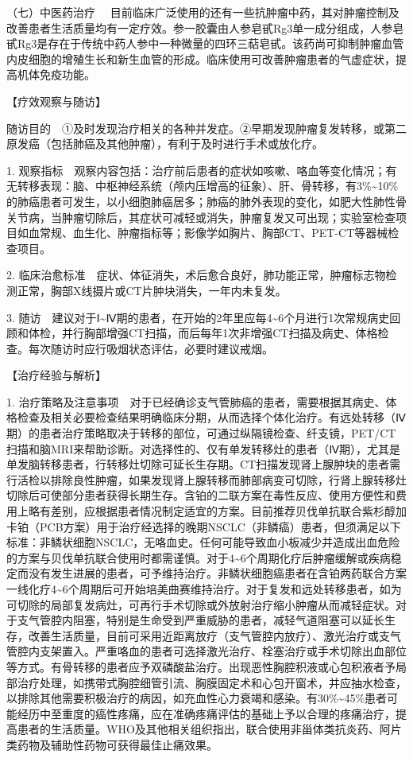 {（七）中医药治疗}
　目前临床广泛使用的还有一些抗肿瘤中药，其对肿瘤控制及改善患者生活质量均有一定疗效。参一胶囊由人参皂甙Rg3单一成分组成，人参皂甙Rg3是存在于传统中药人参中一种微量的四环三萜皂甙。该药尚可抑制肿瘤血管内皮细胞的增殖生长和新生血管的形成。临床使用可改善肿瘤患者的气虚症状，提高机体免疫功能。

【疗效观察与随访】

随访目的　①及时发现治疗相关的各种并发症。②早期发现肿瘤复发转移，或第二原发癌（包括肺癌及其他肿瘤），有利于及时进行手术或放化疗。

1.
观察指标　观察内容包括：治疗前后患者的症状如咳嗽、咯血等变化情况；有无转移表现：脑、中枢神经系统（颅内压增高的征象）、肝、骨转移，有3\%\textasciitilde{}10\%的肺癌患者可发生，以小细胞肺癌居多；肺癌的肺外表现的变化，如肥大性肺性骨关节病，当肿瘤切除后，其症状可减轻或消失，肿瘤复发又可出现；实验室检查项目如血常规、血生化、肿瘤指标等；影像学如胸片、胸部CT、PET-CT等器械检查项目。

2.
临床治愈标准　症状、体征消失，术后愈合良好，肺功能正常，肿瘤标志物检测正常，胸部X线摄片或CT片肿块消失，一年内未复发。

3.
随访　建议对于Ⅰ\textasciitilde{}Ⅳ期的患者，在开始的2年里应每4\textasciitilde{}6个月进行1次常规病史回顾和体检，并行胸部增强CT扫描，而后每年1次非增强CT扫描及病史、体格检查。每次随访时应行吸烟状态评估，必要时建议戒烟。

【治疗经验与解析】

1.
治疗策略及注意事项　对于已经确诊支气管肺癌的患者，需要根据其病史、体格检查及相关必要检查结果明确临床分期，从而选择个体化治疗。有远处转移（Ⅳ期）的患者治疗策略取决于转移的部位，可通过纵隔镜检查、纤支镜，PET/CT扫描和脑MRI来帮助诊断。对选择性的、仅有单发转移灶的患者（Ⅳ期），尤其是单发脑转移患者，行转移灶切除可延长生存期。CT扫描发现肾上腺肿块的患者需行活检以排除良性肿瘤，如果发现肾上腺转移而肺部病变可切除，行肾上腺转移灶切除后可使部分患者获得长期生存。含铂的二联方案在毒性反应、使用方便性和费用上略有差别，应根据患者情况制定适宜的方案。目前推荐贝伐单抗联合紫杉醇加卡铂（PCB方案）用于治疗经选择的晚期NSCLC（非鳞癌）患者，但须满足以下标准：非鳞状细胞NSCLC，无咯血史。任何可能导致血小板减少并造成出血危险的方案与贝伐单抗联合使用时都需谨慎。对于4\textasciitilde{}6个周期化疗后肿瘤缓解或疾病稳定而没有发生进展的患者，可予维持治疗。非鳞状细胞癌患者在含铂两药联合方案一线化疗4\textasciitilde{}6个周期后可开始培美曲赛维持治疗。对于复发和远处转移患者，如为可切除的局部复发病灶，可再行手术切除或外放射治疗缩小肿瘤从而减轻症状。对于支气管腔内阻塞，特别是生命受到严重威胁的患者，减轻气道阻塞可以延长生存，改善生活质量，目前可采用近距离放疗（支气管腔内放疗）、激光治疗或支气管腔内支架置入。严重咯血的患者可选择激光治疗、栓塞治疗或手术切除出血部位等方式。有骨转移的患者应予双磷酸盐治疗。出现恶性胸腔积液或心包积液者予局部治疗处理，如携带式胸腔细管引流、胸膜固定术和心包开窗术，并应抽水检查，以排除其他需要积极治疗的病因，如充血性心力衰竭和感染。有30\%\textasciitilde{}45\%患者可能经历中至重度的癌性疼痛，应在准确疼痛评估的基础上予以合理的疼痛治疗，提高患者的生活质量。WHO及其他相关组织指出，联合使用非甾体类抗炎药、阿片类药物及辅助性药物可获得最佳止痛效果。

